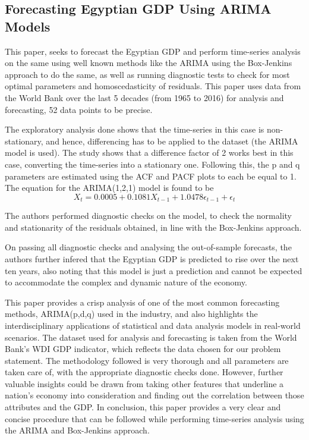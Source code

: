 \documentclass[conference]{IEEEtran}
\begin{document}
\subsection{Forecasting Egyptian GDP Using ARIMA Models}\label{forcastegypt}

This paper\cite{forecastegypt}, seeks to forecast the Egyptian GDP and perform time-series analysis on the same using well known methods like the ARIMA using the Box-Jenkins approach to do the same, as well as running diagnostic tests to check for most optimal parameters and homoscedasticity of residuals. This paper uses data from the World Bank over the last 5 decades (from 1965 to 2016) for analysis and forecasting, 52 data points to be precise. 

The exploratory analysis done shows that the time-series in this case is non-stationary, and hence, differencing has to be applied to the dataset (the ARIMA model is used). The study shows that a difference factor of 2 works best in this case, converting the time-series into a stationary one. Following this, the p and q parameters are estimated using the ACF and PACF plots to each be equal to 1.
The equation for the ARIMA(1,2,1) model is found to be
\[X_t = 0.0005 + 0.1081X_{t-1} + 1.0478\epsilon_{t-1} + \epsilon_t \]


The authors performed diagnostic checks on the model, to check the normality and stationarity of the residuals obtained, in line with the Box-Jenkins approach. 

On passing all diagnostic checks and analysing the out-of-sample forecasts, the authors further infered that the Egyptian GDP is predicted to rise over the next ten years, also noting that this model is just a prediction and cannot be expected to accommodate the complex and dynamic nature of the economy. 

This paper provides a crisp analysis of one of the most common forecasting methods, ARIMA(p,d,q) used in the industry, and also highlights the interdisciplinary applications of statistical and data analysis models in real-world scenarios. The dataset used for analysis and forecasting is taken from the World Bank’s WDI GDP indicator, which reflects the data chosen for our problem statement. The methodology followed is very thorough and all parameters are taken care of, with the appropriate diagnostic checks done. However, further valuable insights could be drawn from taking other features that underline a nation’s economy into consideration and finding out the correlation between those attributes and the GDP. In conclusion, this paper provides a very clear and concise procedure that can be followed while performing time-series analysis using the ARIMA and Box-Jenkins approach.
\end{document}
